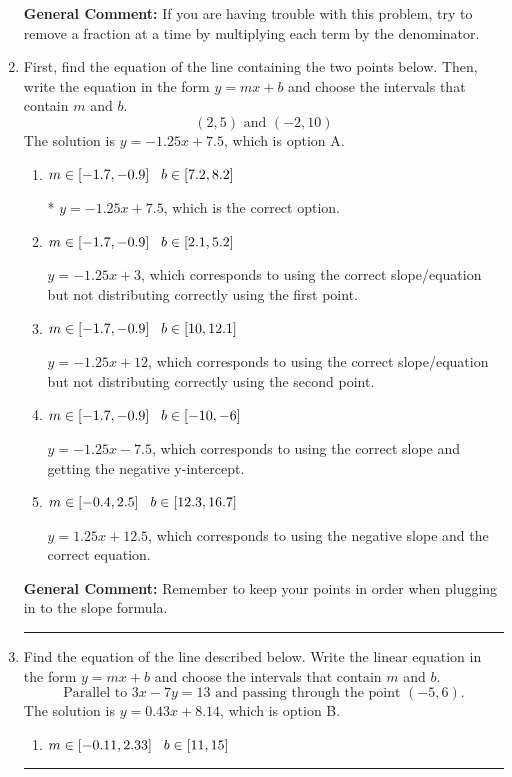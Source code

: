 \documentclass{extbook}[14pt]
\newcommand{\litem}[1]{\item #1

\rule{\textwidth}{0.4pt}}
\begin{document}
\begin{enumerate}
{\textbf{General Comment:} If you are having trouble with this problem, try to remove a fraction at a time by multiplying each term by the denominator.
}
\litem{
First, find the equation of the line containing the two points below. Then, write the equation in the form $ y=mx+b $ and choose the intervals that contain $m$ and $b$.
\[ (2, 5) \text{ and } (-2, 10) \]The solution is \( y = -1.25x + 7.5 \), which is option A.\begin{enumerate}[label=\Alph*.]
\item \( m \in [-1.7, -0.9] \hspace*{3mm} b \in [7.2, 8.2] \)

* $y = -1.25x + 7.5$, which is the correct option.
\item \( m \in [-1.7, -0.9] \hspace*{3mm} b \in [2.1, 5.2] \)

 $y = -1.25x + 3$, which corresponds to using the correct slope/equation but not distributing correctly using the first point.
\item \( m \in [-1.7, -0.9] \hspace*{3mm} b \in [10, 12.1] \)

 $y = -1.25x + 12$, which corresponds to using the correct slope/equation but not distributing correctly using the second point.
\item \( m \in [-1.7, -0.9] \hspace*{3mm} b \in [-10, -6] \)

 $y = -1.25x -7.5$, which corresponds to using the correct slope and getting the negative y-intercept.
\item \( m \in [-0.4, 2.5] \hspace*{3mm} b \in [12.3, 16.7] \)

 $y = 1.25x + 12.5$, which corresponds to using the negative slope and the correct equation.
\end{enumerate}

\textbf{General Comment:} Remember to keep your points in order when plugging in to the slope formula.
}
\litem{
Find the equation of the line described below. Write the linear equation in the form $ y=mx+b $ and choose the intervals that contain $m$ and $b$.
\[ \text{Parallel to } 3 x - 7 y = 13 \text{ and passing through the point } (-5, 6). \]The solution is \( y = 0.43x + 8.14 \), which is option B.\begin{enumerate}[label=\Alph*.]
\item \( m \in [-0.11, 2.33] \hspace*{3mm} b \in [11, 15] \)


\end{enumerate}}
\end{enumerate}
\end{document}

